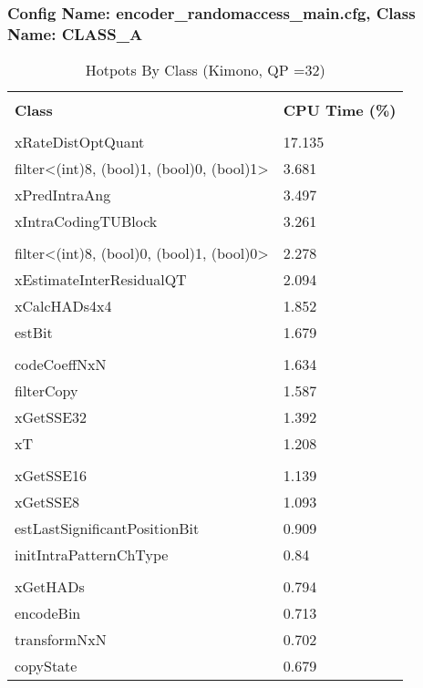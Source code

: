 \documentclass{article}%
\begin{document}
\subsubsection{Config Name: encoder\_randomaccess\_main.cfg, Class Name: CLASS\_A}%
\label{ssubsec:ConfigNameencoderrandomaccessmain.cfg,ClassNameCLASSA}%
\begin{longtabu}{| X[l] | X[l] |}%
\caption{%
Hotpots By Class (Kimono, QP =32)%
}%
\hline%
&\\%
\textbf{Class}&\textbf{CPU Time (\%)}\\%
&\\%
\hline%
\endhead%
xRateDistOptQuant&17.135\\%
\hline%
filter<(int)8, (bool)1, (bool)0, (bool)1>&3.681\\%
\hline%
xPredIntraAng&3.497\\%
\hline%
xIntraCodingTUBlock&3.261\\%
\hline%
&\\%
\hline%
filter<(int)8, (bool)0, (bool)1, (bool)0>&2.278\\%
\hline%
xEstimateInterResidualQT&2.094\\%
\hline%
xCalcHADs4x4&1.852\\%
\hline%
estBit&1.679\\%
\hline%
&\\%
\hline%
codeCoeffNxN&1.634\\%
\hline%
filterCopy&1.587\\%
\hline%
xGetSSE32&1.392\\%
\hline%
xT&1.208\\%
\hline%
&\\%
\hline%
xGetSSE16&1.139\\%
\hline%
xGetSSE8&1.093\\%
\hline%
estLastSignificantPositionBit&0.909\\%
\hline%
initIntraPatternChType&0.84\\%
\hline%
&\\%
\hline%
xGetHADs&0.794\\%
\hline%
encodeBin&0.713\\%
\hline%
transformNxN&0.702\\%
\hline%
copyState&0.679\\%
\hline%
\end{longtabu}%
\newpage%
\end{document}
